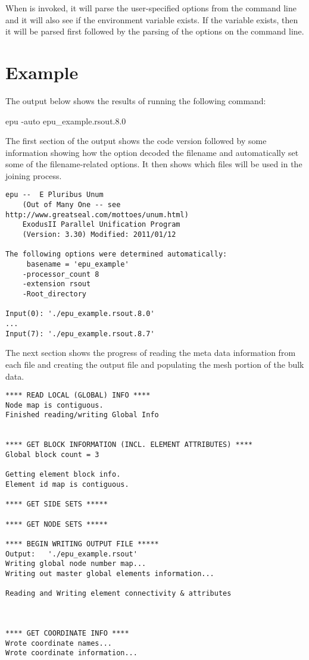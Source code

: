 When \epu{} is invoked, it will parse the user-specified options from
the command line and it will also see if the environment variable
 exists.  If the variable exists, then it will be
parsed first followed by the parsing of the options on the command line.

\section{Example}
The output below shows the results of running the following command:
\begin{syntax}
	epu -auto epu_example.rsout.8.0
\end{syntax}

The first section of the output shows the code version followed by some
information showing how the  option decoded the filename
and automatically set some of the filename-related options.  It then
shows which files will be used in the joining process.

\begin{verbatim}
epu --  E Pluribus Unum
	(Out of Many One -- see http://www.greatseal.com/mottoes/unum.html)
	ExodusII Parallel Unification Program
	(Version: 3.30) Modified: 2011/01/12

The following options were determined automatically:
	 basename = 'epu_example'
	-processor_count 8
	-extension rsout
	-Root_directory 

Input(0): './epu_example.rsout.8.0'
...
Input(7): './epu_example.rsout.8.7'
\end{verbatim}

\sectionline
The next section shows the progress of reading the meta data
information from each file and creating the output file and populating
the mesh portion of the bulk data.

\begin{verbatim}
**** READ LOCAL (GLOBAL) INFO ****
Node map is contiguous.
Finished reading/writing Global Info


**** GET BLOCK INFORMATION (INCL. ELEMENT ATTRIBUTES) ****
Global block count = 3

Getting element block info.
Element id map is contiguous.

**** GET SIDE SETS *****

**** GET NODE SETS *****

**** BEGIN WRITING OUTPUT FILE *****
Output:   './epu_example.rsout'
Writing global node number map...
Writing out master global elements information...

Reading and Writing element connectivity & attributes



**** GET COORDINATE INFO ****
Wrote coordinate names...
Wrote coordinate information...

\end{verbatim}

